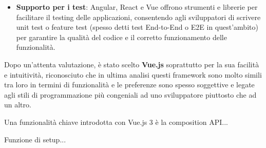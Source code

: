 \begin{itemize}
    \item \textbf{Supporto per i test}: Angular, React e Vue offrono strumenti e librerie per facilitare il testing delle applicazioni, consentendo agli sviluppatori di scrivere unit test o feature test (spesso detti test End-to-End o E2E in quest'ambito) per garantire la qualità del codice e il corretto funzionamento delle funzionalità.
\end{itemize}

Dopo un'attenta valutazione, è stato scelto \textbf{Vue.js} soprattutto per la sua facilità e intuitività, riconosciuto che in ultima analisi questi framework sono molto simili tra loro in termini di funzionalità e le preferenze sono spesso soggettive e legate agli stili di programmazione più congeniali ad uno sviluppatore piuttosto che ad un altro.

Una funzionalità chiave introdotta con Vue.js 3 è la composition API...

Funzione di setup...


